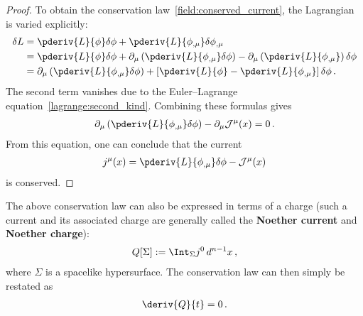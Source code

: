\begin{theorem}
\begin{mdframed}[roundcorner=10pt, linecolor=blue, linewidth=1pt]
\begin{proof}
                To obtain the conservation law~\eqref{field:conserved_current}, the Lagrangian is varied explicitly:
                \begin{align*}
                    \delta L &= \pderiv{L}{\phi}\delta\phi + \pderiv{L}{\phi_{,\mu}}\delta\phi_{,\mu}\\
                    &= \pderiv{L}{\phi}\delta\phi + \partial_\mu\left(\pderiv{L}{\phi_{,\mu}}\delta\phi\right) - \partial_\mu\left(\pderiv{L}{\phi_{,\mu}}\right)\delta\phi\\
                    &= \partial_\mu\left(\pderiv{L}{\phi_{,\mu}}\delta\phi\right) + \left[\pderiv{L}{\phi} - \pderiv{L}{\phi_{,\mu}}\right]\delta\phi\,.
                \end{align*}
                The second term vanishes due to the Euler--Lagrange equation~\eqref{lagrange:second_kind}. Combining these formulas gives
                \begin{gather}
                    \partial_\mu\left(\pderiv{L}{\phi_{,\mu}}\delta\phi\right) - \partial_\mu\mathcal{J}^\mu(x) = 0\,.
                \end{gather}
                From this equation, one can conclude that the current
                \begin{gather}
                    j^\mu(x) = \pderiv{L}{\phi_{,\mu}}\delta\phi - \mathcal{J}^\mu(x)
                \end{gather}
                is conserved.
            \end{proof}
        \end{mdframed}
    \end{theorem}
    The above conservation law can also be expressed in terms of a charge (such a current and its associated charge are generally called the \textbf{Noether current} and \textbf{Noether charge}):
    \begin{gather}
        \label{field:noether_charge}
        Q[\Sigma] := \Int_\Sigma j^0\,d^{n-1}x\,,
    \end{gather}
    where $\Sigma$ is a spacelike hypersurface. The conservation law can then simply be restated as
    \begin{gather}
        \deriv{Q}{t} = 0\,.
    \end{gather}

